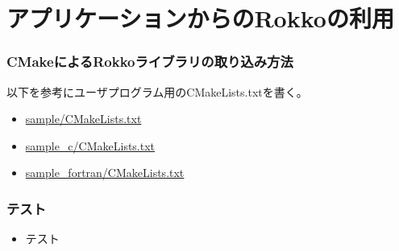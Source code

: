 \section{アプリケーションからのRokkoの利用}

\begin{frame}[c,fragile]
  \frametitle{CMakeによるRokkoライブラリの取り込み方法}
以下を参考にユーザプログラム用のCMakeLists.txtを書く。
\begin{itemize}
  \item \href{https://github.com/t-sakashita/rokko/tree/develop/sample/CMakeLists.txt}{sample/CMakeLists.txt}
  \item \href{https://github.com/t-sakashita/rokko/tree/develop/sample_c/CMakeLists.txt}{sample\_c/CMakeLists.txt}
  \item \href{https://github.com/t-sakashita/rokko/tree/develop/sample_fortran/CMakeLists.txt}{sample\_fortran/CMakeLists.txt}
\end{itemize}
\end{frame}










\begin{frame}
  \frametitle{テスト}
  \begin{itemize}
  \item テスト
  \end{itemize}
\end{frame}

